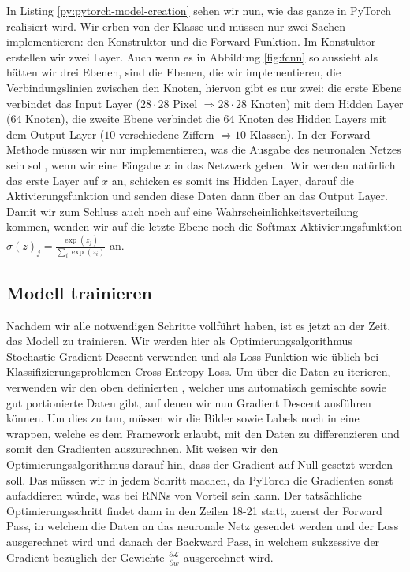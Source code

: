 

In Listing \ref{py:pytorch-model-creation} sehen wir nun, wie das ganze in PyTorch realisiert wird. 
Wir erben von der Klasse  und müssen nur zwei Sachen implementieren: 
den Konstruktor und die Forward-Funktion.
Im Konstuktor erstellen wir zwei Layer. Auch wenn es in Abbildung \ref{fig:fcnn} 
so aussieht als hätten wir drei Ebenen, sind die Ebenen, die wir implementieren, 
die Verbindungslinien zwischen den Knoten, hiervon gibt es nur zwei: 
die erste Ebene verbindet das Input Layer (\(28 \cdot 28\) Pixel \(\Rightarrow 28 \cdot 28\) Knoten) 
mit dem Hidden Layer (\(64\) Knoten), die zweite Ebene verbindet die \(64\) Knoten des Hidden Layers
mit dem Output Layer (\(10\) verschiedene Ziffern \(\Rightarrow 10\) Klassen).
In der Forward-Methode müssen wir nur implementieren, was die Ausgabe des 
neuronalen Netzes sein soll, wenn wir eine Eingabe \(x\) in das Netzwerk geben. 
Wir wenden natürlich das erste Layer auf \(x\) an, schicken es somit ins Hidden Layer, 
darauf die Aktivierungsfunktion und senden diese Daten dann über  an das Output Layer.
Damit wir zum Schluss auch noch auf eine Wahrscheinlichkeitsverteilung kommen, 
wenden wir auf die letzte Ebene noch die Softmax-Aktivierungsfunktion \(\sigma(z)_j = \frac{\exp(z_j)}{\sum_{i} \exp(z_i)}\) an.

\subsection{Modell trainieren}

Nachdem wir alle notwendigen Schritte vollführt haben, ist es jetzt an der Zeit, das Modell zu trainieren. 
Wir werden hier als Optimierungsalgorithmus Stochastic Gradient Descent verwenden und als Loss-Funktion 
wie üblich bei Klassifizierungsproblemen Cross-Entropy-Loss. 
Um über die Daten zu iterieren, verwenden wir den oben definierten 
, welcher uns automatisch gemischte sowie gut portionierte Daten 
gibt, auf denen wir nun Gradient Descent ausführen können. 
Um dies zu tun, müssen wir die Bilder sowie Labels noch in eine  
wrappen, welche es dem Framework erlaubt, mit den Daten zu differenzieren und somit 
den Gradienten auszurechnen. 
Mit  weisen wir den Optimierungsalgorithmus darauf hin, 
dass der Gradient auf Null gesetzt werden soll. Das müssen wir in jedem Schritt machen, 
da PyTorch die Gradienten sonst aufaddieren würde, was bei RNNs von Vorteil sein kann.
Der tatsächliche Optimierungsschritt findet dann in den Zeilen 18-21 statt, 
zuerst der Forward Pass, in welchem die Daten an das neuronale 
Netz gesendet werden und der Loss ausgerechnet wird und danach der Backward Pass, 
in welchem sukzessive der Gradient bezüglich der Gewichte \(\frac{\partial \mathcal{L}}{\partial w}\)
ausgerechnet wird.

